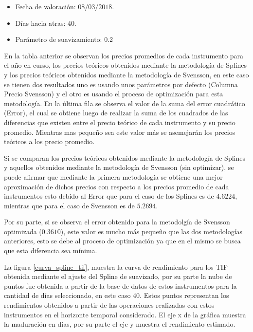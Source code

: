 \begin{itemize}
  \item Fecha de valoraci\'on: $08/03/2018$.
  \item D\'ias hacia atras: 40.
  \item Par\'ametro de suavizamiento: 0.2
\end{itemize}


\hspace{0.4cm} En la tabla anterior se observan los precios promedios de cada instrumento para el a\~no en curso, los precios te\'oricos obtenidos mediante la metodolog\'ia de Splines y los precios te\'oricos obtenidos mediante la metodolog\'ia de Svensson, en este caso se tienen dos resultados uno es usando unos par\'ametros por defecto (Columna Precio Svensson) y el otro es usando el proceso de optimizaci\'on para esta metodolog\'ia. En la \'ultima fila se observa el valor de la suma del error cuadr\'atico (Error), el cual se obtiene luego de realizar la suma de los cuadrados de las diferencias que existen entre el precio te\'orico de cada instrumento y su precio promedio. Mientras mas peque\~no sea este valor m\'as se asemejar\'an los precios te\'oricos a los precio promedio.

\hspace{0.4cm} Si se comparan los precios te\'oricos obtenidos mediante la metodolog\'ia de Splines y aquellos obtenidos mediante la metodolog\'ia de Svensson (sin optimizar), se puede afirmar que mediante la primera metodolog\'ia se obtiene una mejor aproximaci\'on de dichos precios con respecto a los precios promedio de cada instrumentos esto debido al Error que para el caso de los Splines es de $4.6224$, mientras que para el caso de Svensson es de $5.2694$.

\hspace{0.4cm} Por su parte, si se observa el error obtenido para la metodolg\'ia de Svensson optimizada ($0.3610$), este valor es mucho m\'as peque\~no que las dos metodolog\'ias anteriores, esto se debe al proceso de optimizaci\'on ya que en el mismo se busca que esta diferencia sea m\'inima.

\hspace{0.4cm} La figura \ref{curva_spline_tif}, muestra la curva de rendimiento para los TIF obtenida mediante el ajuste del Spline de suavizado, por su parte la nube de puntos fue obtenida a partir de la base de datos de estos instrumentos para la cantidad de d\'ias seleccionado, en este caso 40. Estos puntos representan los rendimientos obtenidos a partir de las operaciones realizadas con estos instrumentos en el horizonte temporal considerado. El eje x de la gr\'afica muestra la maduraci\'on en d\'ias, por su parte el eje y muestra el rendimiento estimado.

